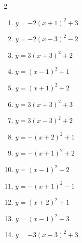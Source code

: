 \documentclass[b5paper,10pt]{ltjsarticle}
\begin{document}
\begin{multicols}{ 2 }
\begin{enumerate}
\vspace{170pt}\item $\displaystyle{} y= -2\left( x+1\right)^{2}+3$

\vspace{170pt}\item $\displaystyle{} y= -2\left( x-3\right)^{2}-2$

\vspace{170pt}\item $\displaystyle{} y= 3\left( x+3\right)^{2}+2$

\vspace{170pt}\item $\displaystyle{} y= \left( x-1\right)^{2}+1$

\vspace{170pt}\item $\displaystyle{} y= \left( x+1\right)^{2}+2$

\vspace{170pt}\item $\displaystyle{} y= 3\left( x+3\right)^{2}+3$

\vspace{170pt}\item $\displaystyle{} y= 3\left( x-3\right)^{2}+2$

\vspace{170pt}\item $\displaystyle{} y= -\left( x+2\right)^{2}+1$

\vspace{170pt}\item $\displaystyle{} y= -\left( x+1\right)^{2}+2$

\vspace{170pt}\item $\displaystyle{} y= \left( x-1\right)^{2}-2$

\vspace{170pt}\item $\displaystyle{} y= -\left( x+1\right)^{2}-1$

\vspace{170pt}\item $\displaystyle{} y= \left( x+2\right)^{2}+1$

\vspace{170pt}\item $\displaystyle{} y= \left( x-1\right)^{2}-3$

\vspace{170pt}\item $\displaystyle{} y= -3\left( x-3\right)^{2}+3$


\end{enumerate}
\end{multicols}
\end{document}
